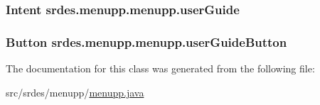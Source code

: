 \hypertarget{classsrdes_1_1menupp_1_1menupp_aef8f3af7461fe00e6bcb9cb9f05f517f}{
\subsubsection[{user\-Guide}]{\setlength{\rightskip}{0pt plus 5cm}\-Intent {\bf srdes.\-menupp.\-menupp.\-user\-Guide}}}\label{classsrdes_1_1menupp_1_1menupp_aef8f3af7461fe00e6bcb9cb9f05f517f}
\hypertarget{classsrdes_1_1menupp_1_1menupp_a8d1983c2ff0ce887838e2019744d43bf}{
\subsubsection[{user\-Guide\-Button}]{\setlength{\rightskip}{0pt plus 5cm}\-Button {\bf srdes.\-menupp.\-menupp.\-user\-Guide\-Button}}}\label{classsrdes_1_1menupp_1_1menupp_a8d1983c2ff0ce887838e2019744d43bf}


\-The documentation for this class was generated from the following file\-:\begin{DoxyCompactItemize}
\item 
src/srdes/menupp/\hyperlink{menupp_8java}{menupp.\-java}\end{DoxyCompactItemize}
